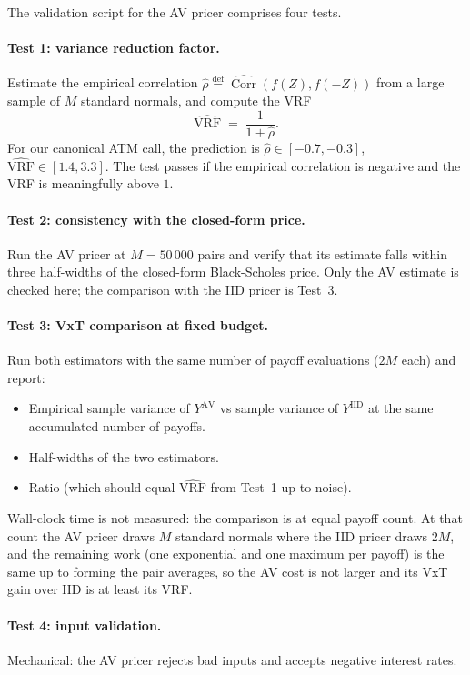 \documentclass[11pt,a4paper]{article}
\theoremstyle{plain}
\theoremstyle{definition}
\theoremstyle{remark}
\newcommand{\Corr}{\operatorname{Corr}}
\newcommand{\eqdef}{\overset{\mathrm{def}}{=}}
\begin{document}
The validation script for the AV pricer comprises four tests.

\paragraph{Test 1: variance reduction factor.} Estimate the empirical
correlation $\hat\rho \eqdef \widehat{\Corr}(f(Z), f(-Z))$ from a
large sample of $M$ standard normals, and compute the VRF
\begin{equation}
\widehat{\mathrm{VRF}} \;=\; \frac{1}{1 + \hat\rho}.
\end{equation}
For our canonical ATM call, the prediction is $\hat\rho \in [-0.7,
-0.3]$, $\widehat{\mathrm{VRF}} \in [1.4, 3.3]$. The test passes if
the empirical correlation is negative and the VRF is meaningfully
above $1$.

\paragraph{Test 2: consistency with the closed-form price.} Run the
AV pricer at $M = 50\,000$ pairs and verify that its estimate falls
within three half-widths of the closed-form Black-Scholes price.
Only the AV estimate is checked here; the comparison with the IID
pricer is Test~3.

\paragraph{Test 3: VxT comparison at fixed budget.} Run both
estimators with the same number of payoff evaluations ($2M$ each)
and report:
\begin{itemize}
\item Empirical sample variance of $Y^{\mathrm{AV}}$ vs sample
variance of $Y^{\mathrm{IID}}$ at the same accumulated number of
payoffs.
\item Half-widths of the two estimators.
\item Ratio (which should equal $\widehat{\mathrm{VRF}}$ from Test~1
up to noise).
\end{itemize}
Wall-clock time is not measured: the comparison is at equal payoff
count. At that count the AV pricer draws $M$ standard normals where
the IID pricer draws $2M$, and the remaining work (one exponential
and one maximum per payoff) is the same up to forming the pair
averages, so the AV cost is not larger and its VxT gain over IID is
at least its VRF.

\paragraph{Test 4: input validation.} Mechanical: the AV pricer
rejects bad inputs and accepts negative interest rates.
\end{document}
